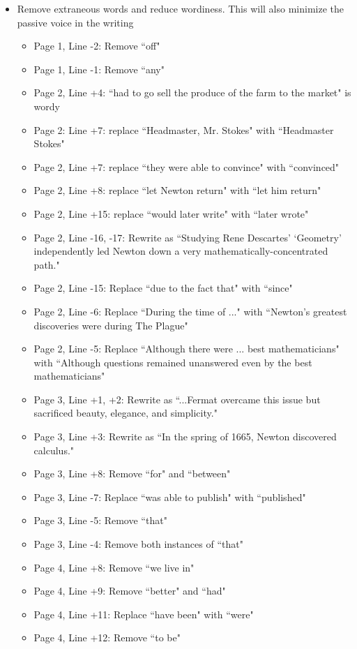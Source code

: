 \documentclass[11pt]{article}
\begin{document}
\begin{itemize}
	\item Remove extraneous words and reduce wordiness. This will also minimize the passive voice in the writing
	\begin{itemize}
		\item Page 1, Line -2: Remove ``off"
		\item Page 1, Line -1: Remove ``any"
		\item Page 2, Line +4: ``had to go sell the produce of the farm to the market" is wordy
		\item Page 2: Line +7: replace ``Headmaster, Mr. Stokes" with ``Headmaster Stokes"
		\item Page 2, Line +7: replace ``they were able to convince" with ``convinced"
		\item Page 2, Line +8: replace ``let Newton return" with ``let him return"
		\item Page 2, Line +15: replace ``would later write" with ``later wrote"
		\item Page 2, Line -16, -17: Rewrite as ``Studying Rene Descartes' `Geometry' independently led Newton down a very mathematically-concentrated path."
		\item Page 2, Line -15: Replace ``due to the fact that" with ``since"
		\item Page 2, Line -6: Replace ``During the time of ..." with ``Newton's greatest discoveries were during The Plague"
		\item Page 2, Line -5: Replace ``Although there were ... best mathematicians" with ``Although questions remained unanswered even by the best mathematicians"
		\item Page 3, Line +1, +2: Rewrite as ``...Fermat overcame this issue but sacrificed beauty, elegance, and simplicity."
		\item Page 3, Line +3: Rewrite as ``In the spring of 1665, Newton discovered calculus."
		\item Page 3, Line +8: Remove ``for" and ``between"
		\item Page 3, Line -7: Replace ``was able to publish" with ``published"
		\item Page 3, Line -5: Remove ``that"
		\item Page 3, Line -4: Remove both instances of ``that"
		\item Page 4, Line +8: Remove ``we live in"
		\item Page 4, Line +9: Remove ``better" and ``had"
		\item Page 4, Line +11: Replace ``have been" with ``were"
		\item Page 4, Line +12: Remove ``to be"

\end{itemize}
\end{itemize}
\end{document}
